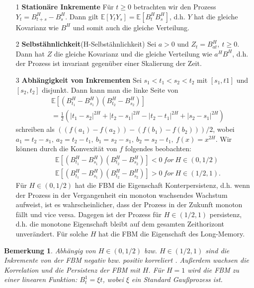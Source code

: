 \documentclass[12pt,titlepage,headsepline]{article}
\newtheorem*{bemerkung*}{Bemerkung}
\begin{document}
      \begin{itemize}
        \item [1] \textbf{Stationäre Inkremente} Für $t \geq 0$ betrachten wir den Prozess $Y_t = B_{t+s}^H - B_s^H$. Dann gilt $\mathbb{E}[Y_tY_s] = \mathbb{E}[B_t^HB_s^H]$, d.h. $Y$ hat die gleiche Kovarianz wie $B^H$ und somit auch die gleiche Verteilung.
        \item [2] \textbf{Selbstähnlichkeit}(H-Selbstähnlichkeit) Sei $a > 0 $ und $Z_t = B_{at}^H, \ t\geq 0$. Dann hat $Z$ die gleiche Kovarianz und die gleiche Verteilung wie $a^HB^H$, d.h. der Prozess ist invariant gegenüber einer Skalierung der Zeit.
        \item [3] \textbf{Abhängigkeit von Inkrementen} Sei $s_1 < t_1 < s_2 < t_2 $ mit $[s_1,t1]$ und $[s_2,t_2]$ disjunkt. Dann kann man die linke Seite von
        \begin{align*}
          & \mathbb{E}[(B_{t_1}^H - B_{s_1}^H)(B_{t_2}^H-B_{s_2}^H)] \\
          & =\frac{1}{2}(\lvert t_1-s_2 \rvert^{2H} + \lvert t_2-s_1 \rvert^{2H} - \lvert t_2-t_1 \rvert^{2H} + \lvert s_2-s_1 \rvert^{2H})
        \end{align*}
        schreiben als $((f(a_1)-f(a_2))-(f(b_1)-f(b_2))) / 2$, wobei $a_1 = t_2-s_1, \ a_2 = t_2 - t_1, \ b_1 = s_2 - s_1, \ b_2 = s_2 - t_1, \ f(x)=x^{2H}$. Wir können durch die Konvexität von $f$ folgendes beobachten:
        \begin{align*}
          & \mathbb{E}[(B_{t_1}^H - B_{s_1}^H)(B_{t_2}^H-B_{s_2}^H)] < 0 \ for \ H \in (0,1/2) \\
          & \mathbb{E}[(B_{t_1}^H - B_{s_1}^H)(B_{t_2}^H-B_{s_2}^H)] > 0 \ for \ H \in (1/2,1).
        \end{align*}
        Für $H \in (0,1/2)$ hat die FBM die Eigenschaft Konterpersistenz, d.h. wenn der Prozess in der Vergangenheit ein monoton wachsendes Wachstum aufweist, ist es wahrscheinlicher, dass der Prozess in der Zukunft monoton fällt und vice versa. Dagegen ist der Prozess für $H \in (1/2,1)$ persistenz, d.h. die monotone Eigenschaft bleibt auf dem gesamten Zeithorizont unverändert. Für solche $H$ hat die FBM die Eigenschaft des Long-Memory.
      \end{itemize}
      \begin{bemerkung*}
        \textup{
        Abhängig von $H \in (0,1/2)$ bzw. $H \in (1/2,1)$ sind die Inkremente von der FBM negativ bzw. positiv korreliert \cite{grimmett2020probability}. Außerdem wachsen die Korrelation und die Persistenz der FBM mit $H$. Für $H=1$ wird die FBM zu einer linearen Funktion: $B_t^1=\xi t$, wobei $\xi$ ein Standard Gaußprozess ist.
        }
      \end{bemerkung*}
      \newpage
\end{document}
